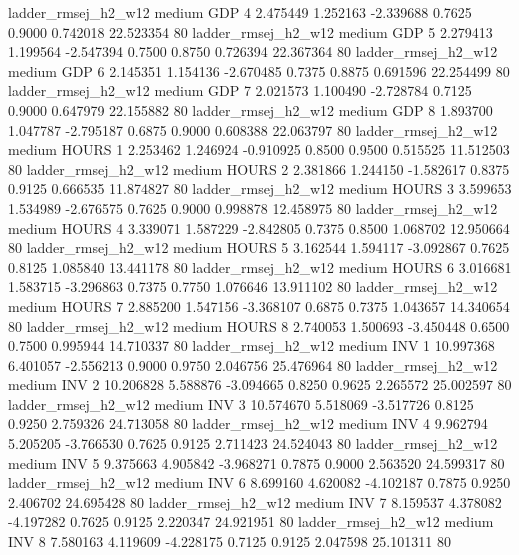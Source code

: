    ladder_rmsej_h2_w12     medium      GDP                 4  2.475449 1.252163 -2.339688 0.7625 0.9000  0.742018   22.523354 80
   ladder_rmsej_h2_w12     medium      GDP                 5  2.279413 1.199564 -2.547394 0.7500 0.8750  0.726394   22.367364 80
   ladder_rmsej_h2_w12     medium      GDP                 6  2.145351 1.154136 -2.670485 0.7375 0.8875  0.691596   22.254499 80
   ladder_rmsej_h2_w12     medium      GDP                 7  2.021573 1.100490 -2.728784 0.7125 0.9000  0.647979   22.155882 80
   ladder_rmsej_h2_w12     medium      GDP                 8  1.893700 1.047787 -2.795187 0.6875 0.9000  0.608388   22.063797 80
   ladder_rmsej_h2_w12     medium    HOURS                 1  2.253462 1.246924 -0.910925 0.8500 0.9500  0.515525   11.512503 80
   ladder_rmsej_h2_w12     medium    HOURS                 2  2.381866 1.244150 -1.582617 0.8375 0.9125  0.666535   11.874827 80
   ladder_rmsej_h2_w12     medium    HOURS                 3  3.599653 1.534989 -2.676575 0.7625 0.9000  0.998878   12.458975 80
   ladder_rmsej_h2_w12     medium    HOURS                 4  3.339071 1.587229 -2.842805 0.7375 0.8500  1.068702   12.950664 80
   ladder_rmsej_h2_w12     medium    HOURS                 5  3.162544 1.594117 -3.092867 0.7625 0.8125  1.085840   13.441178 80
   ladder_rmsej_h2_w12     medium    HOURS                 6  3.016681 1.583715 -3.296863 0.7375 0.7750  1.076646   13.911102 80
   ladder_rmsej_h2_w12     medium    HOURS                 7  2.885200 1.547156 -3.368107 0.6875 0.7375  1.043657   14.340654 80
   ladder_rmsej_h2_w12     medium    HOURS                 8  2.740053 1.500693 -3.450448 0.6500 0.7500  0.995944   14.710337 80
   ladder_rmsej_h2_w12     medium      INV                 1 10.997368 6.401057 -2.556213 0.9000 0.9750  2.046756   25.476964 80
   ladder_rmsej_h2_w12     medium      INV                 2 10.206828 5.588876 -3.094665 0.8250 0.9625  2.265572   25.002597 80
   ladder_rmsej_h2_w12     medium      INV                 3 10.574670 5.518069 -3.517726 0.8125 0.9250  2.759326   24.713058 80
   ladder_rmsej_h2_w12     medium      INV                 4  9.962794 5.205205 -3.766530 0.7625 0.9125  2.711423   24.524043 80
   ladder_rmsej_h2_w12     medium      INV                 5  9.375663 4.905842 -3.968271 0.7875 0.9000  2.563520   24.599317 80
   ladder_rmsej_h2_w12     medium      INV                 6  8.699160 4.620082 -4.102187 0.7875 0.9250  2.406702   24.695428 80
   ladder_rmsej_h2_w12     medium      INV                 7  8.159537 4.378082 -4.197282 0.7625 0.9125  2.220347   24.921951 80
   ladder_rmsej_h2_w12     medium      INV                 8  7.580163 4.119609 -4.228175 0.7125 0.9125  2.047598   25.101311 80
